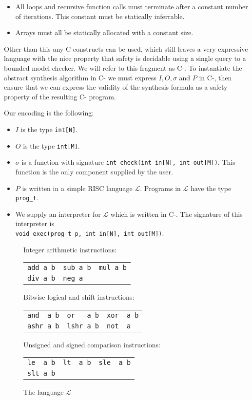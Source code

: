 \documentclass[a4paper]{llncs}
\begin{document}
\begin{itemize}
 \item All loops and recursive function calls must terminate after a constant number
 of iterations.  This constant must be statically inferrable.
 \item Arrays must all be statically allocated with a constant size.
\end{itemize}

Other than this any C constructs can be used, which still leaves a very expressive
language with the nice property that safety is decidable using a single query to a
bounded model checker.  We will refer to this fragment as C-.  To instantiate the
abstract synthesis algorithm in C- we must express $I, O, \sigma$ and $P$ in C-,
then ensure that we can express the validity of the synthesis formula as a safety
property of the resulting C- program.

Our encoding is the following:

\begin{itemize}
 \item $I$ is the type \verb|int[N]|.
 \item $O$ is the type \verb|int[M]|.
 \item $\sigma$ is a function with signature
 \verb|int check(int in[N], int out[M])|. This function is the only component supplied
 by the user.
 \item $P$ is written in a simple RISC language $\mathcal{L}$.  Programs in $\mathcal{L}$
 have the type \verb|prog_t|.
 \item We supply an interpreter for $\mathcal{L}$ which is written in C-.  The signature
 of this interpreter is \\
 \verb|void exec(prog_t p, int in[N], int out[M])|.
\end{itemize}

\begin{figure}
\centering
\begin{minipage}{0.65\textwidth}
\setlength{\tabcolsep}{16pt}
Integer arithmetic instructions:

\begin{tabular}{lll}
 \verb|add a b| & \verb|sub a b| & \verb|mul a b| \\
 \verb|div a b| & \verb|neg a|
\end{tabular}
\bigskip

Bitwise logical and shift instructions:

\begin{tabular}{lll}
 \verb|and  a b| & \verb|or   a b| & \verb|xor  a b| \\
 \verb|ashr a b| & \verb|lshr a b| & \verb|not  a|
\end{tabular}
\bigskip

Unsigned and signed comparison instructions:

\begin{tabular}{lll}
 \verb|le  a b| & \verb|lt  a b| & \verb|sle  a b| \\
 \verb|slt a b|
\end{tabular}
\end{minipage}

 \label{fig:l-language}
 \caption{The language $\mathcal{L}$}
\end{figure}
\end{document}
